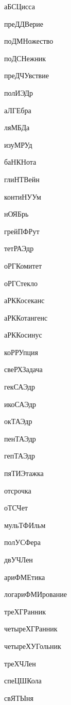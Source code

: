 \begin{multicols}{2}

аБСЦисса

преДДВерие

поДМНожество

поДСНежник

преДЧУвствие

полИЭДр

аЛГЕбра

ляМБДа

изуМРУд

баНКНота

глиНТВейн

контиНУУм

нОЯБрь

грейПФРут

тетРАЭдр

оРГКомитет

оРГСтекло

аРККосеканс

аРККотангенс

аРККосинус

коРРУпция

свеРХЗадача

гекСАЭдр

икоСАЭдр

окТАЭдр

пенТАЭдр

гепТАЭдр

пяТИЭтажка

отсрочка

оТСЧет

мульТФИльм

полУСФера

двУЧЛен

ариФМЕтика

логариФМИрование

треХГРанник

четыреХГРанник

четыреХУГольник

треХЧЛен

спеЦШКола

свЯТЫня
\end{multicols}

